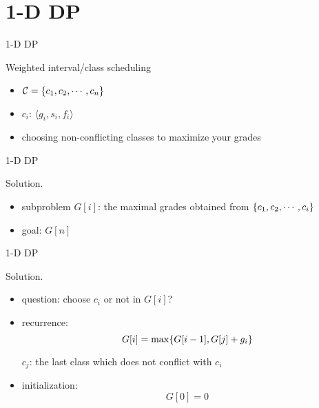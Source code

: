 \section{1-D DP}

\begin{frame}{1-D DP}
  \begin{exampleblock}{Weighted interval/class scheduling }
    \begin{itemize}
      \item $\mathcal{C} = \{c_{1}, c_{2}, \cdots, c_{n}\}$
      \item $c_{i}$: $\langle g_{i}, s_{i}, f_{i} \rangle$
      \item choosing non-conflicting classes to maximize your grades
    \end{itemize}

  \end{exampleblock}
\end{frame}
\begin{frame}{1-D DP}
  \begin{block}{Solution.}
    \begin{itemize}
      \item subproblem $G[i]$: the maximal grades obtained from $\{c_{1}, c_{2}, \cdots, c_{i}\}$
      \item goal: $G[n]$
    \end{itemize}
  \end{block}
\end{frame}
\begin{frame}{1-D DP}
  \begin{block}{Solution.}
    \begin{itemize}
      \item question: choose $c_{i}$ or not in $G[i]$? %
      \item recurrence: 
	\[
	  G[i] = \max \{G[i-1], G[j] + g_{i}\}
	\]
	
	$c_{j}$: the last class which does not conflict with $c_{i}$
      \item initialization:
	\[
	  G[0] = 0
	\]
    \end{itemize}
  \end{block}
\end{frame}
